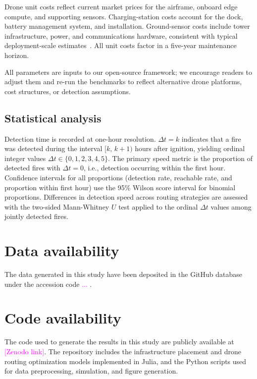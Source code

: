 \documentclass[pdflatex,sn-mathphys-num]{sn-jnl}%
\theoremstyle{thmstyleone}%
\theoremstyle{thmstyletwo}%
\theoremstyle{thmstylethree}%
\newcommand{\danique}[1]{\textcolor{magenta}{#1}}
\begin{document}
Drone unit costs reflect current market prices for the airframe, onboard edge compute, and supporting sensors. Charging-station costs account for the dock, battery management system, and installation. Ground-sensor costs include tower infrastructure, power, and communications hardware, consistent with typical deployment-scale estimates~\cite{GovTech2018WildfireCamera, StatesmanJournal2022OregonCameras}. All unit costs factor in a five-year maintenance horizon.

All parameters are inputs to our open-source framework; we encourage readers to adjust them and re-run the benchmarks to reflect alternative drone platforms, cost structures, or detection assumptions.



\subsection*{Statistical analysis}
Detection time is recorded at one-hour resolution. $\Delta t = k$ indicates that a fire was detected during the interval $[k,\, k+1)$ hours after ignition, yielding ordinal integer values $\Delta t \in \{0,1,2,3,4,5\}$. The primary speed metric is the proportion of detected fires with $\Delta t = 0$, i.e., detection occurring within the first hour. Confidence intervals for all proportions (detection rate, reachable rate, and proportion within first hour) use the 95\% Wilson score interval for binomial proportions. Differences in detection speed across routing strategies are assessed with the two-sided Mann-Whitney $U$ test applied to the ordinal $\Delta t$ values among jointly detected fires.


\section*{Data availability}
The data generated in this study have been deposited in the GitHub
database under the accession code \danique{...} .

\section*{Code availability}
The  code used to generate the results in this study are publicly available at \danique{[Zenodo link]}. The repository includes the infrastructure placement and drone routing optimization models implemented in Julia, and the Python scripts used for data preprocessing, simulation, and figure generation.
\end{document}

